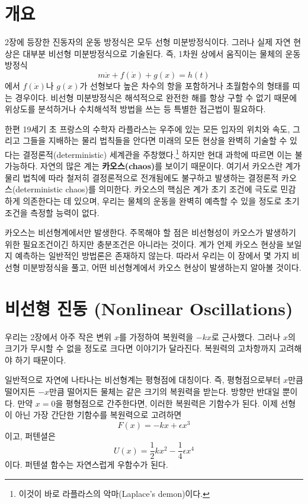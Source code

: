 \documentclass[chapter, oneside, b5paper]{oblivoir}
\theoremstyle{plain}
\theoremstyle{definition}
\theoremstyle{remark}
\begin{document}
\section{개요}
2장에 등장한 진동자의 운동 방정식은 모두 선형 미분방정식이다. 그러나 실제 자연 현상은 대부분 비선형 미분방정식으로 기술된다. 즉, 1차원 상에서 움직이는 물체의 운동 방정식
\begin{equation}
    m\ddot{x}+f(\dot{x})+g(x)=h(t)
\end{equation}
에서 $f(\dot{x})$나 $g(x)$가 선형보다 높은 차수의 항을 포함하거나 초월함수의 형태를 띠는 경우이다. 비선형 미분방정식은 해석적으로 완전한 해를 항상 구할 수 없기 때문에 위상도를 분석하거나 수치해석적 방법을 쓰는 등 특별한 접근법이 필요하다.

한편 19세기 초 프랑스의 수학자 라플라스는 우주에 있는 모든 입자의 위치와 속도, 그리고 그들을 지배하는 물리 법칙들을 안다면 미래의 모든 현상을 완벽히 기술할 수 있다는 결정론적(deterministic) 세계관을 주창했다.\footnote{이것이 바로 라플라스의 악마(Laplace's demon)이다.} 하지만 현대 과학에 따르면 이는 불가능하다. 자연의 많은 계는 \textbf{카오스(chaos)}를 보이기 때문이다. 여기서 카오스란 계가 물리 법칙에 따라 철저히 결정론적으로 전개됨에도 불구하고 발생하는 결정론적 카오스(deterministic chaos)를 의미한다. 카오스의 핵심은 계가 초기 조건에 극도로 민감하게 의존한다는 데 있으며, 우리는 물체의 운동을 완벽히 예측할 수 있을 정도로 초기 조건을 측정할 능력이 없다.

카오스는 비선형계에서만 발생한다. 주목해야 할 점은 비선형성이 카오스가 발생하기 위한 필요조건이긴 하지만 충분조건은 아니라는 것이다. 계가 언제 카오스 현상을 보일지 예측하는 일반적인 방법론은 존재하지 않는다. 따라서 우리는 이 장에서 몇 가지 비선형 미분방정식을 풀고, 어떤 비선형계에서 카오스 현상이 발생하는지 알아볼 것이다.

\section{비선형 진동 (Nonlinear Oscillations)}
우리는 2장에서 아주 작은 변위 $x$를 가정하여 복원력을 $-kx$로 근사했다. 그러나 $x$의 크기가 무시할 수 없을 정도로 크다면 이야기가 달라진다. 복원력의 고차항까지 고려해야 하기 때문이다.

일반적으로 자연에 나타나는 비선형계는 평형점에 대칭이다. 즉, 평형점으로부터 $x$만큼 떨어지든 $-x$만큼 떨어지든 물체는 같은 크기의 복원력을 받는다. 방향만 반대일 뿐이다. 만약 $x=0$을 평형점으로 간주한다면, 이러한 복원력은 기함수가 된다. 이제 선형이 아닌 가장 간단한 기함수를 복원력으로 고려하면
\begin{equation}
    F(x) = -kx + \epsilon x^3
\end{equation}
이고, 퍼텐셜은
\begin{equation}
    U(x) = \frac{1}{2}kx^2 - \frac{1}{4}\epsilon x^4
\end{equation}
이다. 퍼텐셜 함수는 자연스럽게 우함수가 된다.
\end{document}
